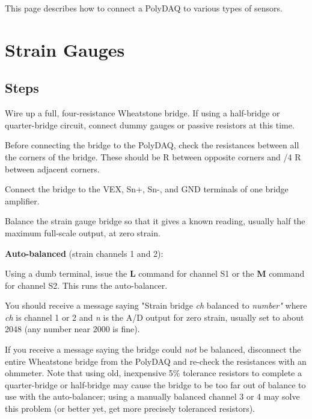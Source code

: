 This page describes how to connect a Poly\-D\-A\-Q to various types of sensors.\hypertarget{pd_sensors_sec_sg}{}\section{Strain Gauges}\label{pd_sensors_sec_sg}
\hypertarget{pd_sensors_sg_steps}{}\subsection{Steps}\label{pd_sensors_sg_steps}

\begin{DoxyEnumerate}
\item Wire up a full, four-\/resistance Wheatstone bridge. If using a half-\/bridge or quarter-\/bridge circuit, connect dummy gauges or passive resistors at this time.
\item Before connecting the bridge to the Poly\-D\-A\-Q, check the resistances between all the corners of the bridge. These should be {\ttfamily R} between opposite corners and {/4} {\ttfamily R} between adjacent corners.
\item Connect the bridge to the {\ttfamily V\-E\-X}, {\ttfamily Sn+}, {\ttfamily Sn-\/}, and {\ttfamily G\-N\-D} terminals of one bridge amplifier.
\item Balance the strain gauge bridge so that it gives a known reading, usually half the maximum full-\/scale output, at zero strain.
\begin{DoxyItemize}
\item {\bfseries Auto-\/balanced} (strain channels 1 and 2)\-:
\begin{DoxyItemize}
\item Using a dumb terminal, issue the {\bfseries L} command for channel {\ttfamily S1} or the {\bfseries M} command for channel {\ttfamily S2}. This runs the auto-\/balancer.
\item You should receive a message saying "{\ttfamily Strain} {\ttfamily bridge} {\itshape ch} {\ttfamily balanced} {\ttfamily to} {\itshape number"} where {\itshape ch} is channel 1 or 2 and {\itshape n} is the A/\-D output for zero strain, usually set to about 2048 (any number near 2000 is fine).
\item If you receive a message saying the bridge could {\itshape not} be balanced, disconnect the entire Wheatstone bridge from the Poly\-D\-A\-Q and re-\/check the resistances with an ohmmeter. Note that using old, inexpensive 5\% tolerance resistors to complete a quarter-\/bridge or half-\/bridge may cause the bridge to be too far out of balance to use with the auto-\/balancer; using a manually balanced channel 3 or 4 may solve this problem (or better yet, get more precisely toleranced resistors).

\end{DoxyItemize}
\end{DoxyItemize}
\end{DoxyEnumerate}
